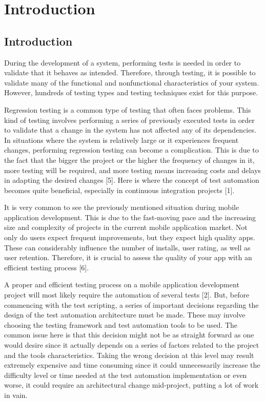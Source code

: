 %
\chapter{Introduction}
\label{sec:intro}

\section{Introduction}

During the development of a system, performing tests is needed in order to validate that it behaves as intended. Therefore, through testing, it is possible to validate many of the functional and nonfunctional characteristics of your system. However, hundreds of testing types and testing techniques exist for this purpose.

Regression testing is a common type of testing that often faces problems. This kind of testing involves performing a series of previously executed tests in order to validate that a change in the system has not affected any of its dependencies. In situations where the system is relatively large or it experiences frequent changes, performing regression testing can become a complication. This is due to the fact that the bigger the project or the higher the frequency of changes in it, more testing will be required, and more testing means increasing costs and delays in adapting the desired changes [5]. Here is where the concept of test automation becomes quite beneficial, especially in continuous integration projects [1].

It is very common to see the previously mentioned situation during mobile application development. This is due to the fast-moving pace and the increasing size and complexity of projects in the current mobile application market. Not only do users expect frequent improvements, but they expect high quality apps. These can considerably influence the number of installs, user rating, as well as user retention. Therefore, it is crucial to assess the quality of your app with an efficient testing process [6].

A proper and efficient testing process on a mobile application development project will most likely require the automation of several tests [2]. But, before commencing with the test scripting, a series of important decisions regarding the design of the test automation architecture must be made. These may involve choosing the testing framework and test automation tools to be used. The common issue here is that this decision might not be as straight forward as one would desire since it actually depends on a series of factors related to the project and the tools characteristics. Taking the wrong decision at this level may result extremely expensive and time consuming since it could unnecessarily increase the difficulty level or time needed at the test automation implementation or even worse, it could require an architectural change mid-project, putting a lot of work in vain. 

